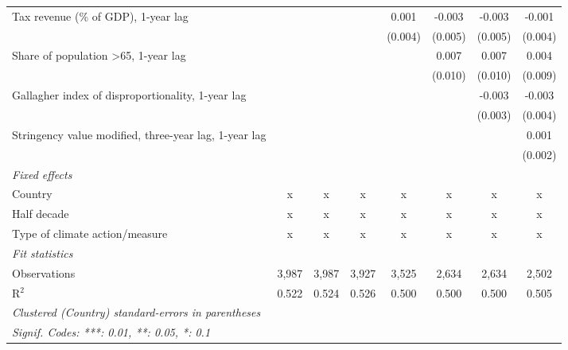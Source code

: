 \begin{tabular}{lccccccc}
   Tax revenue (\% of GDP), 1-year lag                               &                &               &              & 0.001       & -0.003  & -0.003  & -0.001\\   
                                                                     &                &               &              & (0.004)     & (0.005) & (0.005) & (0.004)\\   
   Share of population >65, 1-year lag                               &                &               &              &             & 0.007   & 0.007   & 0.004\\   
                                                                     &                &               &              &             & (0.010) & (0.010) & (0.009)\\   
   Gallagher index of disproportionality, 1-year lag                 &                &               &              &             &         & -0.003  & -0.003\\   
                                                                     &                &               &              &             &         & (0.003) & (0.004)\\   
   Stringency value modified, three-year lag, 1-year lag             &                &               &              &             &         &         & 0.001\\   
                                                                     &                &               &              &             &         &         & (0.002)\\   
   \emph{Fixed effects}\\
   Country                                                           & x              & x             & x            & x           & x       & x       & x\\  
   Half decade                                                       & x              & x             & x            & x           & x       & x       & x\\  
   Type of climate action/measure                                    & x              & x             & x            & x           & x       & x       & x\\  
   \midrule \emph{Fit statistics}\\
   Observations                                                      & 3,987          & 3,987         & 3,927        & 3,525       & 2,634   & 2,634   & 2,502\\  
   R$^2$                                                             & 0.522          & 0.524         & 0.526        & 0.500       & 0.500   & 0.500   & 0.505\\  
   \midrule
   \multicolumn{8}{l}{\emph{Clustered (Country) standard-errors in parentheses}}\\
   \multicolumn{8}{l}{\emph{Signif. Codes: ***: 0.01, **: 0.05, *: 0.1}}\\
\end{tabular}
\par\endgroup


